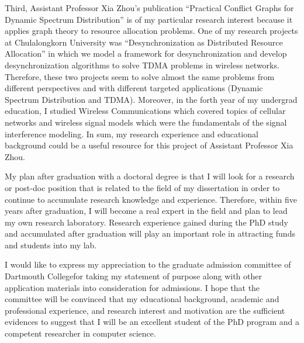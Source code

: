\documentclass[a4paper,10pt]{report}
\newcommand{\university}{Dartmouth College}
\begin{document}
\vspace{0.2cm}
Third, Assistant Professor Xia Zhou's publication ``Practical Conflict Graphs for Dynamic Spectrum Distribution'' is of my particular research interest because it applies graph theory to resource allocation problems. One of my research projects at Chulalongkorn University was ``Desynchronization as Distributed Resource Allocation'' in which we model a framework for desynchronization and develop desynchronization algorithms to solve TDMA problems in wireless networks. Therefore, these two projects seem to solve almost the same problems from different perspectives and with different targeted applications (Dynamic Spectrum Distribution and TDMA). Moreover, in the forth year of my undergrad education, I studied Wireless Communications which covered topics of cellular networks and wireless signal models which were the fundamentals of the signal interference modeling. In sum, my research experience and educational background could be a useful resource for this project of Assistant Professor Xia Zhou. 

\vspace{0.2cm}
My plan after graduation with a doctoral degree is that I will look for a research or post-doc position that is related to the field of my dissertation in order to continue to accumulate research knowledge and experience. Therefore, within five years after graduation, I will become a real expert in the field and plan to lead my own research laboratory. Research experience gained during the PhD study and accumulated after graduation will play an important role in attracting funds and students into my lab.

\vspace{0.2cm}
I would like to express my appreciation to the graduate admission committee of \university \space for taking my  statement of purpose along with other application materials into consideration for admissions. I hope that the committee will be convinced that my educational background, academic and professional experience, and research interest and motivation are the sufficient evidences to suggest that I will be an excellent student of the PhD program and a competent researcher in computer science.
\end{document}
